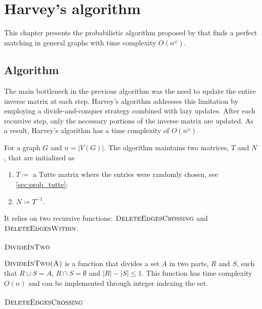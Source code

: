 \chapter{Harvey's algorithm}
\label{chap:harvey}

This chapter presents the probabilistic algorithm proposed by \citet{Harvey:Paper} that finds a perfect matching in general graphs with time complexity \(O(n^\omega)\).

\section{Algorithm}

The main bottleneck in the previous algorithm was the need to update the entire inverse matrix at each step. 
Harvey's algorithm addresses this limitation by employing a divide-and-conquer strategy combined with lazy updates. 
After each recursive step, only the necessary portions of the inverse matrix are updated.
As a result, Harvey's algorithm has a time complexity of \(O(n^\omega)\).

For a graph \(G\) and \(n = |V(G)|\). 
The algorithm maintains two matrices, \(T\) and \(N\), that are initialized as
\begin{enumerate}
  \item \(T \coloneqq \) a Tutte matrix where the entries were randomly chosen, see \cref{sec:prob_tutte};
    \item \(N \coloneqq T^{-1}\).
\end{enumerate}
It relies on two recursive functions: \(\textsc{DeleteEdgesCrossing}\) and \(\textsc{DeleteEdgesWithin}\). 

\subsection{\(\textsc{DivideInTwo}\)}
\(\textsc{DivideInTwo(A)}\) is a function that divides a set \(A\) in two parts, \(R\) and \(S\), such that \(R \cup S = A\), \(R \cap S = \emptyset\) and \(|R| - |S| \leq 1\).
This function has time complexity \(O(n)\) and can be implemented through integer indexing the set.

\subsection{\(\textsc{DeleteEdgesCrossing}\)}

